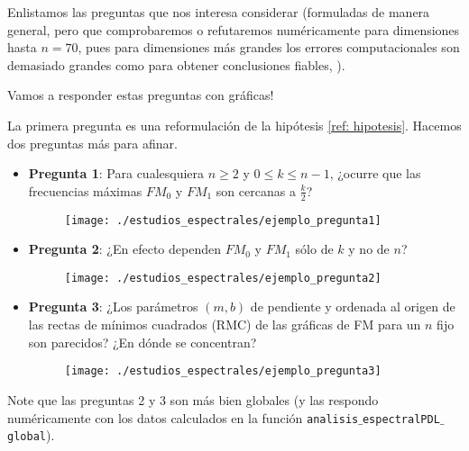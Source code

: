 Enlistamos las preguntas que nos interesa considerar
(formuladas de manera general, pero que comprobaremos o refutaremos
numéricamente para dimensiones hasta $n=70$, pues para dimensiones
más grandes los errores computacionales son demasiado grandes
como para obtener conclusiones fiables, ).

Vamos a responder estas preguntas con gráficas!

La primera pregunta es una reformulación de la 
hipótesis \ref{ref: hipotesis}. Hacemos dos preguntas
más para afinar.

\begin{itemize}
\item \textbf{Pregunta 1}: 
Para cualesquiera $n \geq 2$ y $0 \leq k \leq n-1$,
¿ocurre que las frecuencias máximas
$FM_{0}$ y $FM_{1}$ son cercanas a $\frac{k}{2}$?

\begin{figure}[H]
	\centering
	\texttt{[image: ./estudios\_espectrales/ejemplo\_pregunta1]} 
\end{figure}	

\item \textbf{Pregunta 2}: ¿En efecto dependen $FM_{0}$ y $FM_{1}$ sólo
de $k$ y no de $n$?

\begin{figure}[H]
	\centering
	\texttt{[image: ./estudios\_espectrales/ejemplo\_pregunta2]} 
\end{figure}	

\item \textbf{Pregunta 3}: ¿Los parámetros $(m,b)$ de pendiente y ordenada al 
origen de las rectas de mínimos cuadrados (RMC) de las gráficas 
de FM para un $n$ fijo son parecidos? ¿En dónde se concentran?
\begin{figure}[H]
	\centering
	\texttt{[image: ./estudios\_espectrales/ejemplo\_pregunta3]} 
\end{figure}	
\end{itemize}

Note que las preguntas 2 y 3 son más bien globales
(y las respondo numéricamente con los datos calculados en 
la función \texttt{analisis$\_$espectralPDL$\_$global}).